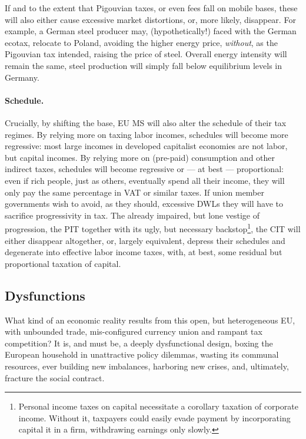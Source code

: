 \documentclass[11pt,a4paper,oneside,openright]{article}
\begin{document}
If and to the extent that Pigouvian taxes, or even fees fall on mobile bases, these will also either cause excessive market distortions, or, more likely, disappear. 
For example, a German steel producer may, (hypothetically!) faced with the German ecotax, relocate to Poland, avoiding the higher energy price, \emph{without}, as the Pigouvian tax intended, raising the price of steel. 
Overall energy intensity will remain the same, steel production will simply fall below equilibrium levels in Germany.

\paragraph{Schedule.} Crucially, by shifting the base, \gls{EU} \gls{MS} will also alter the schedule of their tax regimes. 
By relying more on taxing labor incomes, schedules will become more regressive: 
most large incomes in developed capitalist economies are not labor, but capital incomes. 
By relying more on (pre-paid) consumption and other indirect taxes, schedules will become regressive or --- at best --- proportional: 
even if rich people, just as others, eventually spend all their income, they will only pay the same percentage in \gls{VAT} or similar taxes. 
If union member governments wish to avoid, as they should, excessive \glspl{DWL} they will have to sacrifice progressivity in tax. 
The already impaired, but lone vestige of progression, the \gls{PIT} together with its ugly, but necessary backstop\footnote{
	Personal income taxes on capital necessitate a corollary taxation of corporate income. 
	Without it, taxpayers could easily evade payment by incorporating capital it in a firm, withdrawing earnings only slowly.}, 
the \gls{CIT} will either disappear altogether, or, largely equivalent, depress their schedules and degenerate into effective labor income taxes, with, at best, some residual but proportional taxation of capital.

\subsection{Dysfunctions} \label{sec:defunct} What kind of an economic reality results from this open, but heterogeneous \gls{EU}, with unbounded trade, mis-configured currency union and rampant tax competition? 
It is, and must be, a deeply dysfunctional design, boxing the European household in unattractive policy dilemmas, wasting its communal resources, ever building new imbalances, harboring new crises, and, ultimately, fracture the social contract.
\end{document}
